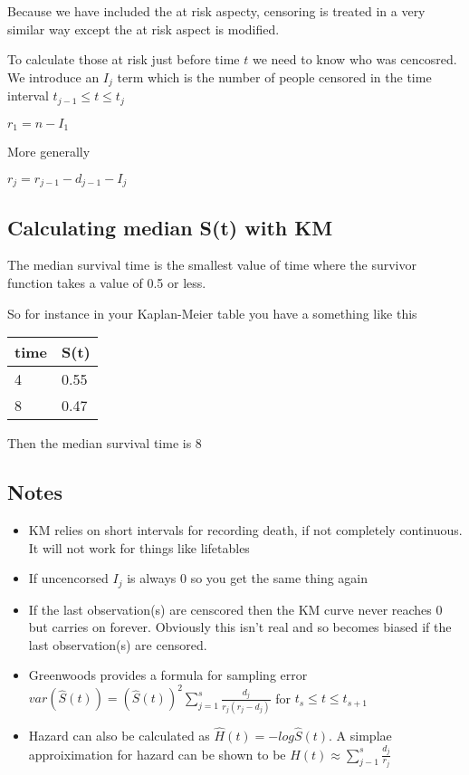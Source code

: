 \documentclass[
  letterpaper,
  DIV=11,
  numbers=noendperiod]{scrreprt}
\providecommand{\tightlist}{%
  \setlength{\itemsep}{0pt}\setlength{\parskip}{0pt}}\usepackage{longtable,booktabs,array}
\begin{document}
Because we have included the at risk aspecty, censoring is treated in a
very similar way except the at risk aspect is modified.

To calculate those at risk just before time \(t\) we need to know who
was cencosred. We introduce an \(I_j\) term which is the number of
people censored in the time interval \(t_{j-1} \leq t \leq t_j\)

\(r_1 = n - I_1\)

More generally

\(r_j = r_{j-1} - d_{j-1} - I_j\)

\hypertarget{calculating-median-st-with-km}{%
\subsection{Calculating median S(t) with
KM}\label{calculating-median-st-with-km}}

The median survival time is the smallest value of time where the
survivor function takes a value of 0.5 or less.

So for instance in your Kaplan-Meier table you have a something like
this

\begin{longtable}[]{@{}ll@{}}
\toprule()
time & S(t) \\
\midrule()
\endhead
4 & 0.55 \\
8 & 0.47 \\
\bottomrule()
\end{longtable}

Then the median survival time is 8

\hypertarget{notes}{%
\subsection{Notes}\label{notes}}

\begin{itemize}
\tightlist
\item
  KM relies on short intervals for recording death, if not completely
  continuous. It will not work for things like lifetables
\item
  If uncencorsed \(I_j\) is always 0 so you get the same thing again
\item
  If the last observation(s) are censcored then the KM curve never
  reaches 0 but carries on forever. Obviously this isn't real and so
  becomes biased if the last observation(s) are censored.
\item
  Greenwoods provides a formula for sampling error
  \(var(\hat{S}(t)) = (\hat{S}(t))^2 \sum^s_{j=1} \frac{d_j}{r_j(r_j - d_j)}\)
  for \(t_s\leq t \leq t_{s+1}\)
\item
  Hazard can also be calculated as \(\hat{H}(t) = -log\hat{S}(t)\). A
  simplae approiximation for hazard can be shown to be
  \(H(t) \approx \sum_{j-1}^s\frac{d_j}{r_j}\)
\end{itemize}
\end{document}
